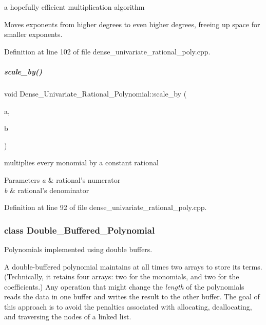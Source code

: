 a hopefully efficient multiplication algorithm 

Moves exponents from higher degrees to even higher degrees, freeing up space for smaller exponents. 

Definition at line 102 of file dense\+\_\+univariate\+\_\+rational\+\_\+poly.\+cpp.

\mbox{\label{group__polygroup_a75113519785d8fba7d957b630bd26a54}} 
\subparagraph{\texorpdfstring{scale\+\_\+by()}{scale\_by()}}
{\footnotesize\ttfamily void Dense\+\_\+\+Univariate\+\_\+\+Rational\+\_\+\+Polynomial\+::scale\+\_\+by (\begin{DoxyParamCaption}\item[{C\+O\+E\+F\+\_\+\+T\+Y\+PE}]{a,  }\item[{U\+C\+O\+E\+F\+\_\+\+T\+Y\+PE}]{b }\end{DoxyParamCaption})}



multiplies every monomial by a constant rational 


\begin{DoxyParams}{Parameters}
{\em a} & rational's numerator \\
\hline
{\em b} & rational's denominator \\
\hline
\end{DoxyParams}


Definition at line 92 of file dense\+\_\+univariate\+\_\+rational\+\_\+poly.\+cpp.

\label{class_double___buffered___polynomial}
\subsubsection{class Double\+\_\+\+Buffered\+\_\+\+Polynomial}
Polynomials implemented using double buffers.

A double-\/buffered polynomial maintains at all times two arrays to store its terms. (Technically, it retains four arrays\+: two for the monomials, and two for the coefficients.) Any operation that might change the {\itshape length} of the polynomials reads the data in one buffer and writes the result to the other buffer. The goal of this approach is to avoid the penalties associated with allocating, deallocating, and traversing the nodes of a linked list. 

